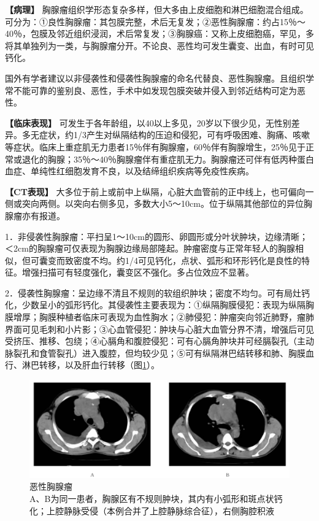 \textbf{【病理】}
胸腺瘤组织学形态复杂多样，但大多由上皮细胞和淋巴细胞混合组成。可分为：①良性胸腺瘤：其包膜完整，术后无复发；②恶性胸腺瘤：约占15％～40％，包膜及邻近组织浸润，术后常复发；③胸腺癌：又称上皮细胞癌，罕见，多将其单独列为一类，与胸腺瘤分开。不论良、恶性均可发生囊变、出血，有时可见钙化。

国外有学者建议以非侵袭性和侵袭性胸腺瘤的命名代替良、恶性胸腺瘤。且组织学常不能可靠的鉴别良、恶性，手术中如发现包膜突破并侵入到邻近结构可定为恶性。

\textbf{【临床表现】}
可发生于各年龄组，以40以上多见，20岁以下很少见，无性别差异。多无症状，约1/3产生对纵隔结构的压迫和侵犯，可有呼吸困难、胸痛、咳嗽等症状。临床上重症肌无力患者15％伴有胸腺瘤，60％伴有胸腺增生，25％见于正常或退化的胸腺；35％～40％胸腺瘤伴有重症肌无力。胸腺瘤还可伴有低丙种蛋白血症、单纯性红细胞发育不良，以及结缔组织疾病等免疫性疾病。

\textbf{【CT表现】}
大多位于前上或前中上纵隔，心脏大血管前的正中线上，也可偏向一侧或突向两侧。以突向右侧多见，多数大小5～10cm。位于纵隔其他部位的异位胸腺瘤亦有报道。

1．非侵袭性胸腺瘤：平扫呈1～10cm的圆形、卵圆形或分叶状肿块，边缘清晰；＜2cm的胸腺瘤可仅表现为胸腺边缘局部隆起。肿瘤密度与正常年轻人的胸腺相似，但可囊变而致密度不均。约1/4可见钙化，点状、弧形和环形钙化是良性的特征。增强扫描可有轻度强化，囊变区不强化。多占位效应不显著。

2．侵袭性胸腺瘤：呈边缘不清且不规则的软组织肿块；密度不均匀。可有局灶钙化，少数呈小的弧形钙化。其侵袭性主要表现为：①纵隔胸膜侵犯：表现为纵隔胸膜增厚；胸膜种植者临床可表现为血性胸水；②肺侵犯：肿瘤突向邻近肺野，瘤肺界面可见毛刺和小片影；③心血管侵犯：肿块与心脏大血管分界不清，增强后可见受挤压、推移、包绕；④心膈角和腹腔侵犯：可有心膈角肿块并可经膈裂孔（主动脉裂孔和食管裂孔）进入腹腔，但均较少见；⑤可有纵隔淋巴结转移和肺、胸膜血行、淋巴转移，以及肝血行转移（图\ref{fig9-53}）。

\begin{figure}[!htbp]
 \centering
 \includegraphics[width=.7\textwidth,height=\textheight,keepaspectratio]{./images/Image00255.jpg}
 \captionsetup{justification=centering}
 \caption{恶性胸腺瘤\\{\small A、B为同一患者，胸腺区有不规则肿块，其内有小弧形和斑点状钙化；上腔静脉受侵（本例合并了上腔静脉综合征），右侧胸腔积液}}
 \label{fig9-53}
  \end{figure} 

